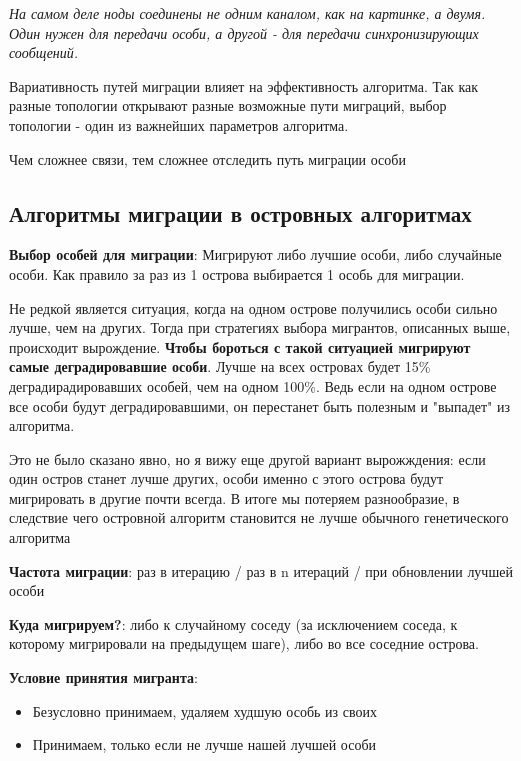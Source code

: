 \textit{На самом деле ноды соединены не одним каналом, как на картинке, а двумя. Один нужен для передачи особи, а другой - для передачи синхронизирующих сообщений.
}


Вариативность путей миграции влияет на эффективность алгоритма. Так как разные топологии открывают разные возможные пути миграций, выбор топологии - один из важнейших параметров алгоритма.

Чем сложнее связи, тем сложнее отследить путь миграции особи

\subsection*{Алгоритмы миграции в островных алгоритмах}

\textbf{Выбор особей для миграции}:
Мигрируют либо лучшие особи, либо случайные особи. Как правило за раз из 1 острова выбирается 1 особь для миграции. 

Не редкой является ситуация, когда на одном острове получились особи сильно лучше, чем на других. Тогда при стратегиях выбора мигрантов, описанных выше, происходит вырождение. \textbf{Чтобы бороться с такой ситуацией мигрируют самые деградировавшие особи}. Лучше на всех островах будет 15\% деградирадировавших особей, чем на одном 100\%. Ведь если на одном острове все особи будут деградировавшими, он перестанет быть полезным и "выпадет" из алгоритма. 

Это не было сказано явно, но я вижу еще другой вариант вырожждения: если один остров станет лучше других, особи именно с этого острова будут мигрировать в другие почти всегда. В итоге мы потеряем разнообразие, в следствие чего островной алгоритм становится не лучше обычного генетического алгоритма 

\textbf{Частота миграции}: раз в итерацию / раз в n итераций / при обновлении лучшей особи

\textbf{Куда мигрируем?}: либо к случайному соседу (за исключением соседа, к которому мигрировали на предыдущем шаге), либо во все соседние острова.

\textbf{Условие принятия мигранта}:
\begin{itemize}
    \item Безусловно принимаем, удаляем худшую особь из своих
    \item Принимаем, только если не лучше нашей лучшей особи 
\end{itemize}

